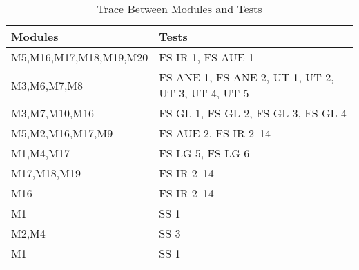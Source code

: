 \documentclass[12pt]{article}
\begin{document}
\begin{table}[!htbp]
      \begin{tabular}{ll}
        \toprule
        Modules & Tests \\
        \midrule
        \color{red}
        M5,M16,M17,M18,M19,M20 & FS-IR-1, FS-AUE-1 \\
        \color{red}
        M3,M6,M7,M8 & FS-ANE-1, FS-ANE-2, UT-1, UT-2, UT-3, UT-4, UT-5\\
        \color{red}
        M3,M7,M10,M16 & FS-GL-1, FS-GL-2, FS-GL-3, FS-GL-4 \\
        \color{red}
        M5,M2,M16,M17,M9 & FS-AUE-2, FS-IR-2~14 \\
        \color{red}
        M1,M4,M17 & FS-LG-5, FS-LG-6 \\
        \color{red}
        M17,M18,M19 & FS-IR-2~14  \\
        \color{red}
        M16 & FS-IR-2~14 \\
        \color{red}
        M1 & SS-1  \\
        \color{red}
        M2,M4 & SS-3 \\
        \color{red}
        M1 & SS-1  \\
        
        \bottomrule
        \end{tabular}
        \caption{Trace Between Modules and Tests}
        \makeatletter
           \def\rulecolor#1#{\CT@arc{#1}}
           \def\CT@arc#1#2{%
           \ifdim\baselineskip=\z@\noalign\fi
           {\gdef\CT@arc@{\color#1{#2}}}}
           \let\CT@arc@\relax
        \makeatother
        \label{Table 2}
        \end{table}
\FloatBarrier	
\end{document}
